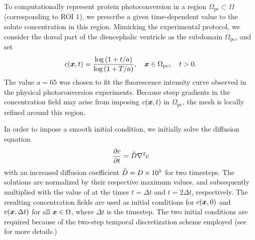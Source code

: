 \documentclass{WileyMSP-template}
\begin{document}
To computationally represent protein photoconversion in a region
$\Omega_{\mathrm{pc}} \subset \Omega$ (corresponding to ROI 1),
we prescribe a given time-dependent value to the solute concentration in this region. 
Mimicking the experimental protocol, we consider the dorsal part of the
diencephalic ventricle as the subdomain $\Omega_{\mathrm{pc}}$, and set
\begin{equation}
  c(\bm{x}, t)=\frac{\log{(1+t/a)}}{\log{(1+T/a)}},
  \quad \bm{x} \in \Omega_{\mathrm{pc}}, \quad t > 0.
\label{eq:photoconversion_curve}
\end{equation}
The value $a=65$ was chosen to fit the fluorescence intensity curve
observed in the physical photoconversion experiments. Because steep gradients
in the concentration field may arise from imposing $c(\bm{x}, t)$ in $\Omega_{\mathrm{pc}}$,
the mesh is locally refined around this region.

In order to impose a smooth initial condition, we initially solve the diffusion equation
\begin{equation*}
    \frac{\partial c}{\partial t} = \Tilde{D}\nabla^2 c
\end{equation*}
with an increased diffusion coefficient $\Tilde{D}=D\times 10^{5}$ for two timesteps.
The solutions are normalized by their respective maximum values, and subsequently
multiplied with the value of  at the times $t=\Delta t$
and $t=2\Delta t$, respectively.
The resulting concentration fields are used as initial conditions for $c(\bm{x}, 0)$ and
$c(\bm{x}, \Delta t)$ for all $\bm{x}\in\Omega$, where $\Delta t$
is the timestep. The two initial conditions are required because of the
two-step temporal discretization scheme employed (see~ for more details.)
\end{document}
